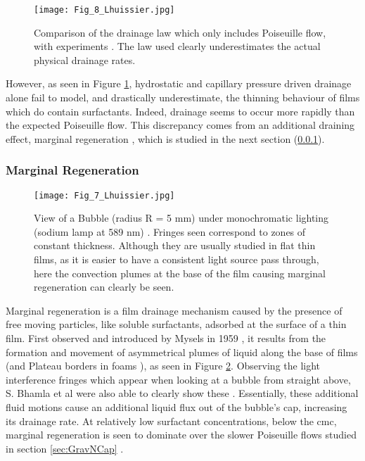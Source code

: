 \documentclass[a4paper,12pt]{article}
\numberwithin{equation}{section}
\numberwithin{figure}{section}
\numberwithin{table}{section}
\begin{document}
\begin{figure}[!htbp]
    \centering
    \captionsetup{width=.9\linewidth}
    \texttt{[image: Fig\_8\_Lhuissier.jpg]}
    \caption{Comparison of the drainage law which only includes Poiseuille flow, with experiments \cite{Lhuissier2011}. The law used clearly underestimates the actual physical drainage rates.}
    \label{fig:Lhuissier8}
\end{figure}

However, as seen in Figure \ref{fig:Lhuissier8}, hydrostatic and capillary pressure driven drainage alone fail to model, and drastically underestimate, the thinning behaviour of films which do contain surfactants. Indeed, drainage seems to occur more rapidly than the expected Poiseuille flow. This discrepancy comes from an additional draining effect, marginal regeneration \cite{Mysels1959Book}, which is studied in the next section (\ref{sec:marginalReg}).

\subsubsection{Marginal Regeneration}
\label{sec:marginalReg}

\begin{figure}[!htbp]
    \centering
    \captionsetup{width=.9\linewidth}
    \texttt{[image: Fig\_7\_Lhuissier.jpg]}
    \caption{View of a Bubble (radius R = 5 mm) under monochromatic lighting (sodium lamp at 589 nm) \cite{Lhuissier2011}. Fringes seen correspond to zones of constant thickness. Although they are usually studied in flat thin films, as it is easier to have a consistent light source pass through, here the convection plumes at the base of the film causing marginal regeneration can clearly be seen. }
    \label{fig:Lhuissier7}
\end{figure}

Marginal regeneration is a film drainage mechanism caused by the presence of free moving particles, like soluble surfactants, adsorbed at the surface of a thin film. First observed and introduced by Mysels in 1959 \cite{Mysels1959Book}, it results from the formation and movement of asymmetrical plumes of liquid along the base of films (and Plateau borders in foams \cite{Breward2002}), as seen in Figure \ref{fig:Lhuissier7}. Observing the light interference fringes which appear when looking at a bubble from straight above, S. Bhamla et al were also able to clearly show these \cite{Bhamla2017}. Essentially, these additional fluid motions cause an additional liquid flux out of the bubble's cap, increasing its drainage rate. At relatively low surfactant concentrations, below the cmc, marginal regeneration is seen to dominate over the slower Poiseuille flows studied in section \ref{sec:GravNCap} \cite{Lhuissier2011, Bhamla2017}.
\end{document}
